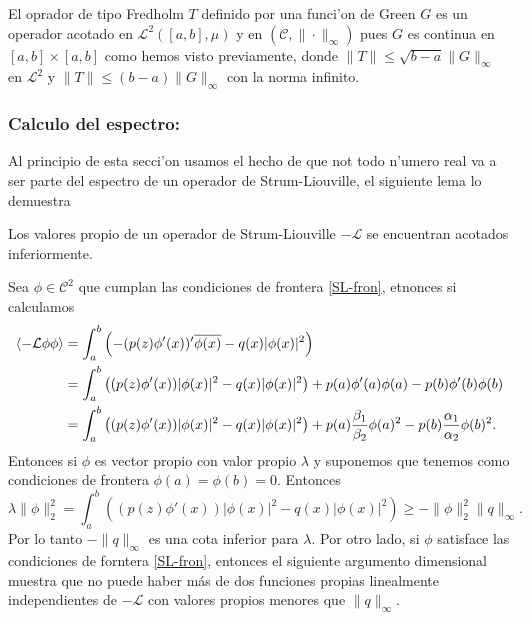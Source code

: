 \documentclass[main.tex]{subfiles}
\begin{document}
\obs El oprador de tipo Fredholm $T$ definido por una funci'on de Green $G$ es un operador acotado en $\mathcal{L}^{2}([a,b],\mu)$ y en $(\mathcal{C},\|\cdot\|_{\infty})$ pues $G$ es continua en $[a,b]\times[a,b]$ como hemos visto previamente, donde $\|T\|\leq\sqrt{b-a}\|G\|_{\infty}$ en $\mathcal{L}^{2}$ y $\|T\|\leq(b-a)\|G\|_{\infty}$ con la norma infinito.

\subsubsection*{Calculo del espectro:}
\noindent Al principio de esta secci'on usamos el hecho de que not todo n'umero real va a ser parte del espectro de un operador de Strum-Liouville, el siguiente lema lo demuestra
\begin{lema}
  Los valores propio de un operador de Strum-Liouville $-\mathcal{L}$ se encuentran acotados inferiormente.
  \end{lema}
  \dem Sea $\phi\in\mathcal{C}^{2}$ que cumplan las condiciones de frontera \ref{SL-fron}, etnonces si calculamos
  \begin{align*}  \braket{-\mathcal{L}\phi\phi}&=\int_{a}^{b}\left(-(p(z)\phi'(x))'\overline{\phi(x)}-q(x)|\phi(x)|^{2}\right)\\
                              &=\int_{a}^{b}\left((p(z)\phi'(x))|\phi(x)|^{2}-q(x)|\phi(x)|^{2}\right)
                                                +p(a)\phi'(a)\phi(a)-p(b)\phi'(b)\phi(b)\\
                              &=\int_{a}^{b}\left((p(z)\phi'(x))|\phi(x)|^{2}-q(x)|\phi(x)|^{2}\right)
                              +p(a)\frac{\beta_{1}}{\beta_{2}}\phi(a)^{2}-p(b)\frac{\alpha_{1}}{\alpha_{2}}\phi(b)^{2}.
  \end{align*}
  Entonces si $\phi$ es vector propio con valor propio $\lambda$ y suponemos que tenemos como condiciones de frontera $\phi(a)=\phi(b)=0.$ Entonces
  \[
    \lambda\|\phi\|_{2}^{2}=\int_{a}^{b}\left((p(z)\phi'(x))|\phi(x)|^{2}-q(x)|\phi(x)|^{2}\right)\geq-\|\phi\|^{2}_{2}\|q\|_{\infty}.
  \]
  Por lo tanto $-\|q\|_{\infty}$ es una cota inferior para $\lambda$. Por otro lado, si $\phi$ satisface las condiciones de forntera \ref{SL-fron},
entonces el siguiente argumento dimensional muestra que no puede haber más de dos funciones propias linealmente independientes de $-\mathcal{L}$ con valores propios menores que $\|q\|_{\infty}$.
\end{document}

